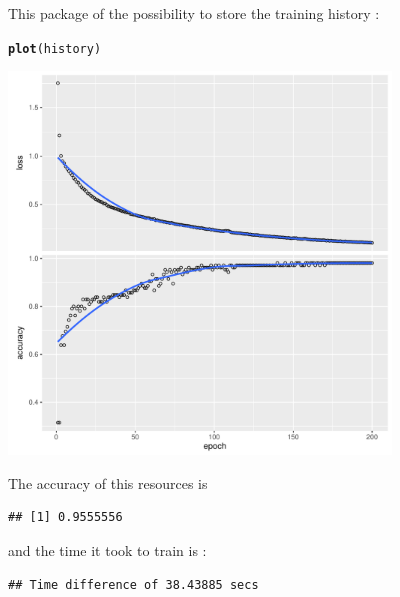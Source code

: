 \documentclass[letter]{article}\usepackage[]{graphicx}\usepackage[]{color}
\makeatletter
\newcommand{\hlstd}[1]{\textcolor[rgb]{0.345,0.345,0.345}{#1}}%
\newcommand{\hlkwd}[1]{\textcolor[rgb]{0.737,0.353,0.396}{\textbf{#1}}}%
\newenvironment{kframe}{%
 \def\at@end@of@kframe{}%
 \ifinner\ifhmode%
  \def\at@end@of@kframe{\end{minipage}}%
  \begin{minipage}{\columnwidth}%
 \fi\fi%
 \def\FrameCommand##1{\hskip\@totalleftmargin \hskip-\fboxsep
 \colorbox{shadecolor}{##1}\hskip-\fboxsep
     \hskip-\linewidth \hskip-\@totalleftmargin \hskip\columnwidth}%
 \MakeFramed {\advance\hsize-\width
   \@totalleftmargin\z@ \linewidth\hsize
   \@setminipage}}%
 {\par\unskip\endMakeFramed%
 \at@end@of@kframe}
\newenvironment{knitrout}{}{} %
\makeatother
\begin{document}
This package of the possibility to store the training history :
\begin{knitrout}
\color{fgcolor}\begin{kframe}
\begin{alltt}
\hlkwd{plot}\hlstd{(history)}
\end{alltt}
\end{kframe}
\includegraphics[width=4in]{figure/unnamed-chunk-18-1} 

\end{knitrout}

The accuracy of this resources is
\begin{knitrout}
\color{fgcolor}\begin{kframe}
\begin{verbatim}
## [1] 0.9555556
\end{verbatim}
\end{kframe}
\end{knitrout}
and the time it took to train is :
\begin{knitrout}
\color{fgcolor}\begin{kframe}
\begin{verbatim}
## Time difference of 38.43885 secs
\end{verbatim}
\end{kframe}
\end{knitrout}
\end{document}
